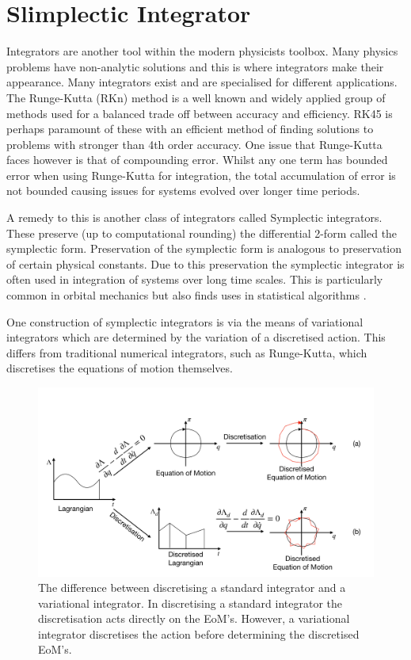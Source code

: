 \documentclass[10pt]{iopart}
\begin{document}
\section{Slimplectic Integrator}
\label{Symplectic}
Integrators are another tool within the modern physicists toolbox. Many physics problems have non-analytic solutions and this is where integrators make their appearance. Many integrators exist and are specialised for different applications. The Runge-Kutta (RKn) method \cite{RungeKutta} is a well known and widely applied group of methods used for a balanced trade off between accuracy and efficiency. RK45 is perhaps paramount of these with an efficient method of finding solutions to problems with stronger than 4th order accuracy. One issue that Runge-Kutta faces however is that of compounding error. Whilst any one term has bounded error when using Runge-Kutta for integration, the total accumulation of error is not bounded causing issues for systems evolved over longer time periods. 

A remedy to this is another class of integrators called Symplectic integrators. These preserve (up to computational rounding) the differential 2-form called the symplectic form. Preservation of the symplectic form is analogous to preservation of certain physical constants. Due to this preservation the symplectic integrator is often used in integration of systems over long time scales. This is particularly common in orbital mechanics \cite{WISDOM, ReinTamayo} but also finds uses in statistical algorithms \cite{Neal_MCMC}.

One construction of symplectic integrators is via the means of variational integrators which are determined by the variation of a discretised action. This differs from traditional numerical integrators, such as Runge-Kutta, which discretises the equations of motion themselves. 


\begin{figure}
	\label{VariationalIntegrator}
	\centering
	\includegraphics[width=\columnwidth]{Variational.pdf}
	\caption{The difference between discretising a standard integrator and a variational integrator. In discretising a standard integrator the discretisation acts directly on the EoM's. However, a variational integrator discretises the action before determining the discretised EoM's.}
\end{figure}
\end{document}
